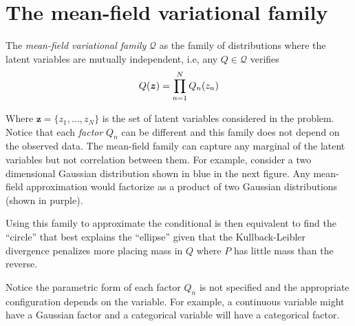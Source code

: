 
\section{The mean-field variational family}

The \emph{mean-field variational family} \(\mathcal{Q}\) as the family of distributions where the latent variables are mutually independent, i.e, any \(Q \in \mathcal{Q}\) verifies
\[
  Q(\bm{z}) = \prod_{n=1}^{N}Q_{n}(z_{n})
\]

Where \(\bm{z} = \{z_{1},\dots,z_{N}\}\) is the set of latent variables considered in the problem. Notice that each \emph{factor} \(Q_{n}\) can be different and this family does not depend on the observed data. The mean-field family can capture any marginal of the latent variables but not correlation between them. For example, consider a two dimensional Gaussian distribution shown in blue in the next figure. Any mean-field approximation would factorize as a product of two Gaussian distributions (shown in purple).



\begin{figure}[h!]
\centering
{}
\end{figure}

Using this family to approximate the conditional is then equivalent to find the ``circle'' that best explains the ``ellipse'' given that the Kullback-Leibler divergence penalizes more placing mass in \(Q\) where \(P\) has little mass than the reverse.

Notice the parametric form of each factor \(Q_{n}\) is not specified and the appropriate configuration depends on the variable. For example, a continuous variable might have a Gaussian factor and a categorical variable will have a categorical factor.

